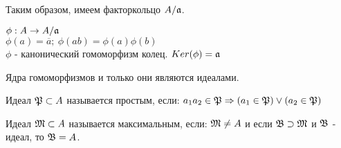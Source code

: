 Таким образом, имеем факторкольцо $A/\mathfrak{a}$.

\begin{thm}
$\phi: A \rightarrow A/\mathfrak{a}$ \\
$\phi(a) = \overline{a};~\phi(ab) = \phi(a)\phi(b)$ \\
$\phi$ - канонический гомоморфизм колец. $Ker(\phi) = \mathfrak{a}$
\end{thm}

\begin{thm}
Ядра гомоморфизмов и только они являются идеалами.
\end{thm}

\begin{defn}
Идеал $\mathfrak{P} \subset A$ называется простым, если: $a_1a_2 \in \mathfrak{P} \Rightarrow (a_1 \in \mathfrak{P})\vee(a_2 \in \mathfrak{P})$
\end{defn}

\begin{defn}
Идеал $\mathfrak{M} \subset A$ называется максимальным, если: $\mathfrak{M} \neq A$ и если $\mathfrak{B} \supset \mathfrak{M}$ и $\mathfrak{B}$ - идеал, то $\mathfrak{B} = A$.
\end{defn}
